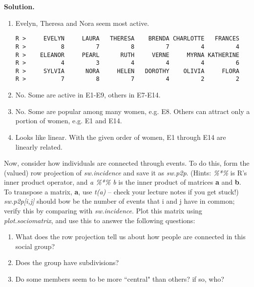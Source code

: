 \documentclass[11pt, oneside]{article}\usepackage[]{graphicx}\usepackage[]{color}
\makeatletter
\newenvironment{kframe}{%
 \def\at@end@of@kframe{}%
 \ifinner\ifhmode%
  \def\at@end@of@kframe{\end{minipage}}%
  \begin{minipage}{\columnwidth}%
 \fi\fi%
 \def\FrameCommand##1{\hskip\@totalleftmargin \hskip-\fboxsep
 \colorbox{shadecolor}{##1}\hskip-\fboxsep
     \hskip-\linewidth \hskip-\@totalleftmargin \hskip\columnwidth}%
 \MakeFramed {\advance\hsize-\width
   \@totalleftmargin\z@ \linewidth\hsize
   \@setminipage}}%
 {\par\unskip\endMakeFramed%
 \at@end@of@kframe}
\newenvironment{knitrout}{}{} %
\newenvironment{solution}{\begin{trivlist} \item \textbf{Solution.}}{\end{trivlist}}
\newenvironment{prob}[2][Problem]{\begin{trivlist}
\item[\hskip \labelsep {\bfseries #1}\hskip \labelsep {\bfseries #2.}]}{\end{trivlist}}
\makeatother
\begin{document}
\begin{prob}{2}
\begin{enumerate}
\begin{solution}
  \begin{enumerate}
  \item Evelyn, Theresa and Nora seem most active.
\begin{knitrout}
\color{fgcolor}\begin{kframe}
\begin{verbatim}
R >     EVELYN     LAURA   THERESA    BRENDA CHARLOTTE   FRANCES 
R >          8         7         8         7         4         4 
R >    ELEANOR     PEARL      RUTH     VERNE     MYRNA KATHERINE 
R >          4         3         4         4         4         6 
R >     SYLVIA      NORA     HELEN   DOROTHY    OLIVIA     FLORA 
R >          7         8         7         4         2         2
\end{verbatim}
\end{kframe}
\end{knitrout}
  \item No. Some are active in E1-E9, others in E7-E14.
  \item No. Some are popular among many women, e.g. E8. Others can attract only a portion 
of women, e.g. E1 and E14.
  \item Looks like linear. With the given order of women, E1 through E14 are linearly 
related.
  \end{enumerate}
\end{solution}

\item Now, consider how individuals are connected through events. To do this, form the (valued) row projection of \emph{sw.incidence} and save it as \emph{sw.p2p}. (Hints: \emph{\%*\%} is R's inner product operator, and \emph{a \%*\% b} is the inner product of matrices \textbf{a} and \textbf{b}. To transpose a matrix, \textbf{a}, use \emph{t(a)} -- check your lecture notes if you get stuck!) \emph{sw.p2p[i,j]} should bow be the number of events that i and j have in common; verify this by comparing with \emph{sw.incidence}. Plot this matrix using \emph{plot.sociomatrix}, and use this to answer the following questions:

\begin{enumerate}
\item What does the row projection tell us about how people are connected in this social group?
\item Does the group have subdivisions?
\item Do some members seem to be more ``central" than others? if so, who?
\end{enumerate}


\end{enumerate}
\end{prob}
\end{document}
